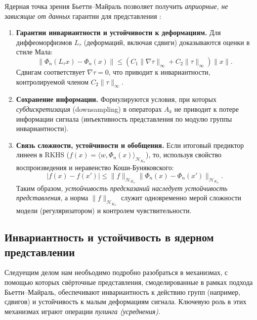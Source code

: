 \documentclass[../NDCNNAI_main.tex]{subfiles}
\begin{document}
Ядерная точка зрения Бьетти--Майраль позволяет получить \emph{априорные, не зависящие от данных} гарантии для представления \cite{Bietti_Group}:

\begin{enumerate}
    \item \textbf{Гарантии инвариантности и устойчивости к деформациям.} Для диффеоморфизмов \(L_\tau\) (деформаций, включая сдвиги) доказываются оценки в стиле Мала:
    \[
    \|\Phi_n(L_\tau x) - \Phi_n(x)\| \leq (C_1\|\nabla\tau\|_\infty + C_2\|\tau\|_\infty) \|x\|.
    \]
    Сдвигам соответствует \(\nabla\tau = 0\), что приводит к инвариантности, контролируемой членом \(C_2\|\tau\|_\infty\).

    \item \textbf{Сохранение информации.} Формулируются условия, при которых \emph{субдискретизация} (downsampling) в операторах \(A_k\) не приводит к потере информации сигнала (инъективность представления по модулю группы инвариантности).

    \item \textbf{Связь сложности, устойчивости и обобщения.} Если итоговый предиктор линеен в RKHS (\(f(x) = \langle w, \Phi_n(x) \rangle_{\mathcal{H}_{K_n}}\)), то, используя свойство воспроизведения и неравенство Коши-Буняковского:
    \[
    |f(x) - f(x')| \leq \|f\|_{\mathcal{H}_{K_n}} \|\Phi_n(x) - \Phi_n(x')\|_{\mathcal{H}_{K_n}}.
    \]
    Таким образом, \emph{устойчивость предсказаний наследует устойчивость представления}, а норма \(\|f\|_{\mathcal{H}_{K_n}}\) служит одновременно мерой сложности модели (регуляризатором) и контролем чувствительности.
\end{enumerate}

\subsection{Инвариантность и устойчивость в ядерном представлении}
Следуещим делом нам необъодимо подробно разобраться в механизмах, с помощью которых свёрточные представления, смоделированные в рамках подхода Бьетти--Майраль, обеспечивают инвариантность к действию групп (например, сдвигов) и устойчивость к малым деформациям сигнала. Ключевую роль в этих механизмах играют операции \emph{пулинга (усреднения)}.
\end{document}
